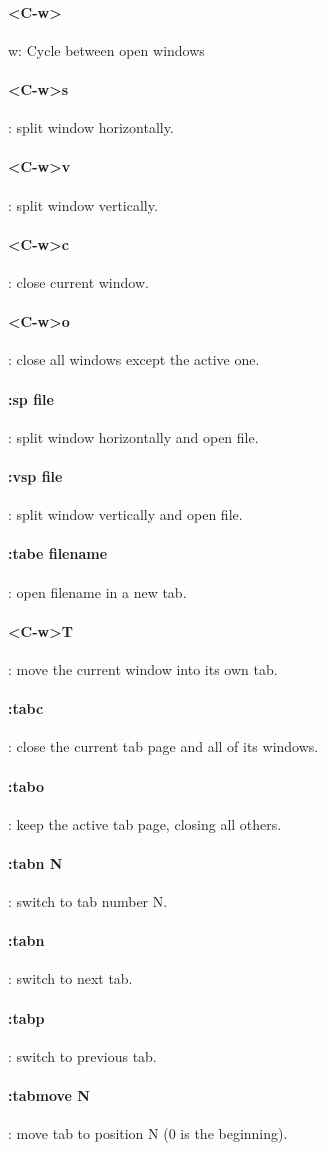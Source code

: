 \documentclass[10pt,letterpaper]{book}
\begin{document}
\paragraph{<C-w>}w: Cycle between open windows
\paragraph{<C-w>s}: split window horizontally.
\paragraph{<C-w>v}: split window vertically.
\paragraph{<C-w>c}: close current window.
\paragraph{<C-w>o}: close all windows except the active one.
\paragraph{:sp {file}}: split window horizontally and open {file}.
\paragraph{:vsp {file}}: split window vertically and open {file}.
\paragraph{:tabe {filename}}: open {filename} in a new tab.
\paragraph{<C-w>T}: move the current window into its own tab.
\paragraph{:tabc}: close the current tab page and all of its windows.
\paragraph{:tabo}: keep the active tab page, closing all others.
\paragraph{:tabn N}: switch to tab number N.
\paragraph{:tabn}: switch to next tab.
\paragraph{:tabp}: switch to previous tab.
\paragraph{:tabmove N}: move tab to position N (0 is the beginning).
\end{document}
